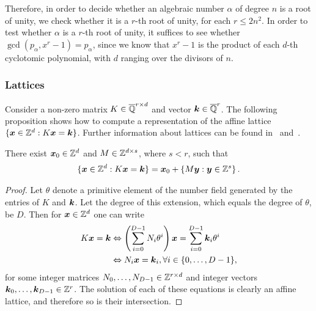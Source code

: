 Therefore, in order to decide whether an algebraic number $\alpha$ of degree $n$ is a root of unity, we check whether it is a $r$-th root of unity, for each $r\leq 2n^2$. In order to test whether $\alpha$ is a $r$-th root of unity, it suffices to see whether $\gcd(p_\alpha,x^r-1)=p_\alpha$, since we know that $x^r-1$ is the product of each $d$-th cyclotomic polynomial, with $d$ ranging over the divisors of $n$.


\subsubsection{Lattices}

Consider a non-zero matrix $K\in\overline{\mathbb{Q}}^{r\times d}$ and vector $\boldsymbol{k} \in \overline{\mathbb{Q}}^r$.  The following proposition shows how to compute a representation of the affine lattice $\{ \boldsymbol{x} \in \mathbb{Z}^{d} : K\boldsymbol{x} = \boldsymbol{k} \}$. Further information about lattices can be found in~\cite{LatticeBook} and~\cite{Cohen}.

\begin{proposition}
There exist $\boldsymbol{x}_{0} \in \mathbb{Z}^{d}$ and
$M \in \mathbb{Z}^{d \times s}$, where $s < r$, such that
\begin{align*}
  \{ \boldsymbol{x}\in\mathbb{Z}^{d} : K\boldsymbol{x} =
  \boldsymbol{k} \} =
  \boldsymbol{x}_{0} + \{ M \boldsymbol{y} : \boldsymbol{y} \in \mathbb{Z}^s \} \, .
\end{align*}
\end{proposition}

\begin{proof}
  Let $\theta$ denote a primitive element of the number field
  generated by the entries of $K$ and $\boldsymbol{k}$. Let the degree of this extension, which equals the degree of $\theta$, be $D$. Then for $\boldsymbol{x} \in \mathbb{Z}^{d}$ one can write
\begin{align*}
K \boldsymbol{x} = \boldsymbol{k} &\Leftrightarrow \left( \sum \limits_{i=0}^{D-1} N_{i} \theta^{i} \right) \boldsymbol{x} = \sum \limits_{i=0}^{D-1} \boldsymbol{k}_{i} \theta^{i} \\
&\Leftrightarrow N_{i} \boldsymbol{x} = \boldsymbol{k}_{i}, \forall i \in \lbrace 0, \ldots, D-1 \rbrace ,
\end{align*}
for some integer matrices $N_{0}, \ldots, N_{D-1} \in \mathbb{Z}^{r \times d}$ and integer
vectors $\boldsymbol{k}_{0}, \ldots, \boldsymbol{k}_{D-1} \in \mathbb{Z}^{r}$.
The solution of each of these equations is clearly an affine lattice, and therefore so is their intersection.
\end{proof}

